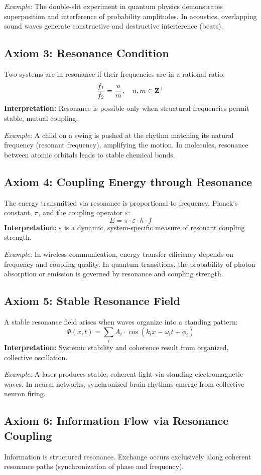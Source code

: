 \documentclass[12pt]{iopart}
\providecommand{\mathbb}[1]{\mathbf{#1}}
\providecommand{\quad}{\hskip1em\relax}
\begin{document}
\textit{Example:} The double-slit experiment in quantum physics demonstrates superposition and interference of probability amplitudes. In acoustics, overlapping sound waves generate constructive and destructive interference (beats).

\subsection{Axiom 3: Resonance Condition}
Two systems are in resonance if their frequencies are in a rational ratio:
\[
\frac{f_1}{f_2} = \frac{n}{m},\quad n, m \in \mathbb{Z}^+
\]
\textbf{Interpretation:} Resonance is possible only when structural frequencies permit stable, mutual coupling.

\textit{Example:} A child on a swing is pushed at the rhythm matching its natural frequency (resonant frequency), amplifying the motion. In molecules, resonance between atomic orbitals leads to stable chemical bonds.

\subsection{Axiom 4: Coupling Energy through Resonance}
The energy transmitted via resonance is proportional to frequency, Planck's constant, $\pi$, and the coupling operator $\varepsilon$:
\[
E = \pi \cdot \varepsilon \cdot h \cdot f
\]
\textbf{Interpretation:} $\varepsilon$ is a dynamic, system-specific measure of resonant coupling strength.

\textit{Example:} In wireless communication, energy transfer efficiency depends on frequency and coupling quality. In quantum transitions, the probability of photon absorption or emission is governed by resonance and coupling strength.

\subsection{Axiom 5: Stable Resonance Field}
A stable resonance field arises when waves organize into a standing pattern:
\[
\Phi(x, t) = \sum_{i} A_i \cdot \cos(k_i x - \omega_i t + \phi_i)
\]
\textbf{Interpretation:} Systemic stability and coherence result from organized, collective oscillation.

\textit{Example:} A laser produces stable, coherent light via standing electromagnetic waves. In neural networks, synchronized brain rhythms emerge from collective neuron firing.

\subsection{Axiom 6: Information Flow via Resonance Coupling}
Information is structured resonance. Exchange occurs exclusively along coherent resonance paths (synchronization of phase and frequency).
\end{document}
